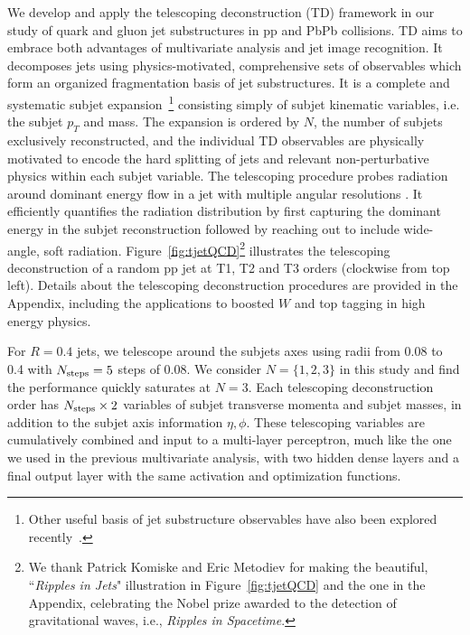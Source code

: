 \documentclass[notoc,preprintnumbers]{JHEP3}
\begin{document}
We develop and apply the telescoping deconstruction (TD) framework in our study of quark and gluon jet substructures in pp and PbPb collisions. TD aims to embrace both advantages of multivariate analysis and jet image recognition. It decomposes jets using physics-motivated, comprehensive sets of observables which form an organized fragmentation basis of jet substructures. It is a complete and systematic subjet expansion~\footnote{Other useful basis of jet substructure observables have also been explored recently~\cite{Datta:2017rhs, Komiske:2017aww}.} consisting simply of subjet kinematic variables, i.e. the subjet $p_T$ and mass. The expansion is ordered by $N$, the number of subjets exclusively reconstructed, and the individual TD observables are physically motivated to encode the hard splitting of jets and relevant non-perturbative physics within each subjet variable. The telescoping procedure probes radiation around dominant energy flow in a jet with multiple angular resolutions \cite{Chien:2013kca,Adams:2015hiv,Chien:2014hla,Chien:2017xrb}. It efficiently quantifies the radiation distribution by first capturing the dominant energy in the subjet reconstruction followed by reaching out to include wide-angle, soft radiation. Figure~\ref{fig:tjetQCD}\footnote{We thank Patrick Komiske and Eric Metodiev for making the beautiful, ``{\sl Ripples in Jets}" illustration in Figure~\ref{fig:tjetQCD} and the one in the Appendix, celebrating the Nobel prize awarded to the detection of gravitational waves, i.e., {\sl Ripples in Spacetime}.} illustrates the telescoping deconstruction of a random pp jet at T1, T2 and T3 orders (clockwise from top left). Details about the telescoping deconstruction procedures are provided in the Appendix, including the applications to boosted $W$ and top tagging in high energy physics.

For $R=0.4$ jets, we telescope around the subjets axes using radii from 0.08 to 0.4 with $N_{\rm steps} = 5$ steps of 0.08. We consider $N=\{1,2,3\}$ in this study and find the performance quickly saturates at $N=3$. Each telescoping deconstruction order has $N_{\rm steps} \times 2$ variables of subjet transverse momenta and subjet masses, in addition to the subjet axis information $\eta, \phi$. %
These telescoping variables are cumulatively combined and input to a multi-layer perceptron, much like the one we used in the previous multivariate analysis, with two hidden dense layers and a final output layer with the same activation and optimization functions.
\end{document}
